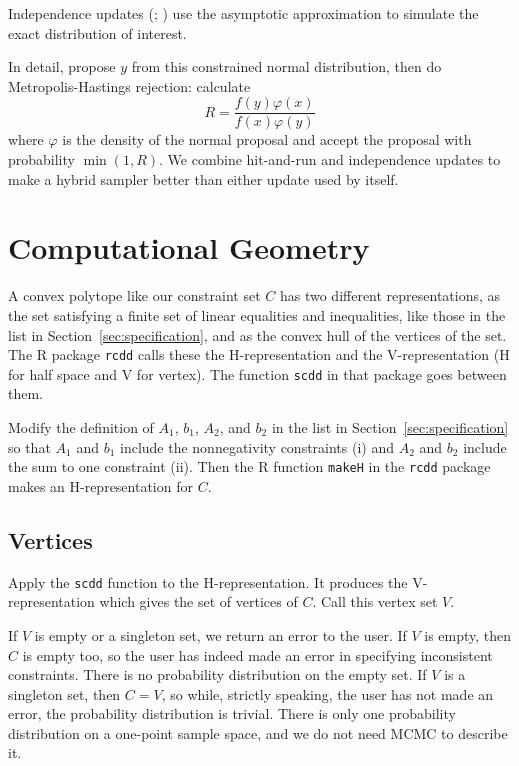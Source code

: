 \documentclass[11pt]{article}
\begin{document}
Independence updates (\citealp{hastings};
\citealp[Section~2.3.3]{tierney}) use the asymptotic approximation
to simulate the exact distribution of interest.

In detail, propose $y$ from this constrained normal distribution,
then do Metropolis-Hastings rejection: calculate
$$
    R = \frac{f(y) \varphi(x)}{f(x) \varphi(y)}
$$
where $\varphi$ is the density of the normal proposal and accept the
proposal with probability $\min(1, R)$.
We combine hit-and-run and independence updates to make a hybrid sampler
\citep[Section~2.4]{tierney} better than either update used by itself.

\section{Computational Geometry} \label{sec:computational-geometry}

A convex polytope like our constraint set $C$ has two different
representations, as the set satisfying a finite set of linear equalities
and inequalities, like those in the list in Section~\ref{sec:specification},
and as the convex hull
of the vertices of the set.   The R package \texttt{rcdd} calls these
the H-representation and the V-representation
(H for half space and V for vertex).  The function
\texttt{scdd} in that package goes between them.

Modify the definition of $A_1$, $b_1$, $A_2$, and $b_2$ in the list in
Section~\ref{sec:specification}
so that $A_1$ and $b_1$ include the nonnegativity constraints (i) and
$A_2$ and $b_2$ include the sum to one constraint (ii).  Then the
R function \texttt{makeH} in the \texttt{rcdd} package makes
an H-representation for $C$.

\subsection{Vertices}

Apply the \texttt{scdd} function to the H-representation.
It produces the V-representation which gives the set of vertices of $C$.
Call this vertex set $V$.

If $V$ is empty or a singleton set, we return an error to the user.
If $V$ is empty, then $C$ is empty too, so the user has indeed made an
error in specifying inconsistent constraints.  There is no probability
distribution on the empty set.
If $V$ is a singleton set, then $C = V$, so while, strictly speaking,
the user has not made an error, the probability distribution is trivial.
There is only one probability distribution on a one-point sample space,
and we do not need MCMC to describe it.
\end{document}
